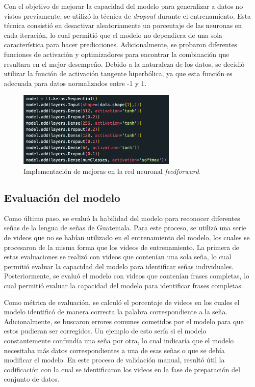Con el objetivo de mejorar la capacidad del modelo para generalizar a datos no vistos previamente, se utilizó la técnica de \textit{dropout} durante el entrenamiento.
Esta técnica consistió en desactivar aleatoriamente un porcentaje de las neuronas en cada iteración, lo cual permitió que el modelo no dependiera de una sola característica para hacer predicciones.
Adicionalmente, se probaron diferentes funciones de activación y optimizadores para encontrar la combinación que resultara en el mejor desempeño.
Debido a la naturaleza de los datos, se decidió utilizar la función de activación tangente hiperbólica, ya que esta función es adecuada para datos normalizados entre -1 y 1.

\begin{figure}[H]
    \centering
    \includegraphics[width=0.7\textwidth]{figuras/ImprovedFNN.png}
    \caption{Implementación de mejoras en la red neuronal \textit{feedforward}.}
    \label{fig:dropout}
\end{figure}

\subsection{Evaluación del modelo}
Como último paso, se evaluó la habilidad del modelo para reconocer diferentes señas de la lengua de señas de Guatemala.  
Para este proceso, se utilizó una serie de videos que no se habían utilizado en el entrenamiento del modelo, los cuales se procesaron de la misma forma que los videos de entrenamiento.
La primera de estas evaluaciones se realizó con videos que contenían una sola seña, lo cual permitió evaluar la capacidad del modelo para identificar señas individuales.
Posteriormente, se evaluó el modelo con videos que contenían frases completas, lo cual permitió evaluar la capacidad del modelo para identificar frases completas.

Como métrica de evaluación, se calculó el porcentaje de videos en los cuales el modelo identificó de manera correcta la palabra correspondiente a la seña.  
Adicionalmente, se buscaron errores comunes cometidos por el modelo para que estos pudieran ser corregidos.  
Un ejemplo de esto sería si el modelo constantemente confundía una seña por otra, lo cual indicaría que el modelo necesitaba más datos correspondientes a una de esas señas o que se debía modificar el modelo.  
En este proceso de validación manual, resultó útil la codificación con la cual se identificaron los videos en la fase de preparación del conjunto de datos.

